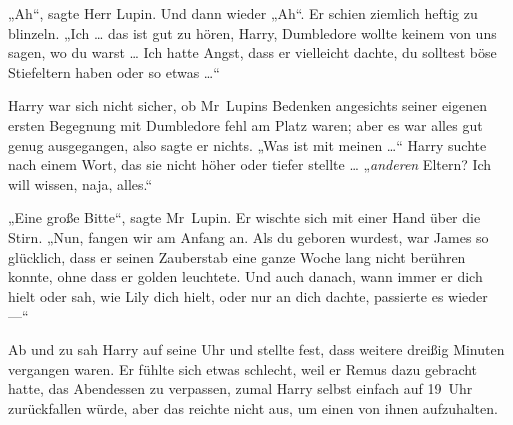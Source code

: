 „Ah“, sagte Herr Lupin. Und dann wieder „Ah“. Er schien ziemlich heftig zu blinzeln.
„Ich … das ist gut zu hören, Harry, Dumbledore wollte keinem von uns sagen, wo du warst … Ich hatte Angst, dass er vielleicht dachte, du solltest böse Stiefeltern haben oder so etwas …“

Harry war sich nicht sicher, ob Mr~Lupins Bedenken angesichts seiner eigenen ersten Begegnung mit Dumbledore fehl am Platz waren; aber es war alles gut genug ausgegangen, also sagte er nichts.
„Was ist mit meinen …“ Harry suchte nach einem Wort, das sie nicht höher oder tiefer stellte …
„\emph{anderen} Eltern? Ich will wissen, naja, alles.“

„Eine große Bitte“, sagte Mr~Lupin. Er wischte sich mit einer Hand über die Stirn.
„Nun, fangen wir am Anfang an. Als du geboren wurdest, war James so glücklich, dass er seinen Zauberstab eine ganze Woche lang nicht berühren konnte, ohne dass er golden leuchtete. Und auch danach, wann immer er dich hielt oder sah, wie Lily dich hielt, oder nur an dich dachte, passierte es wieder —“

\later

Ab und zu sah Harry auf seine Uhr und stellte fest, dass weitere dreißig Minuten vergangen waren. Er fühlte sich etwas schlecht, weil er Remus dazu gebracht hatte, das Abendessen zu verpassen, zumal Harry selbst einfach auf 19~Uhr zurückfallen würde, aber das reichte nicht aus, um einen von ihnen aufzuhalten.


